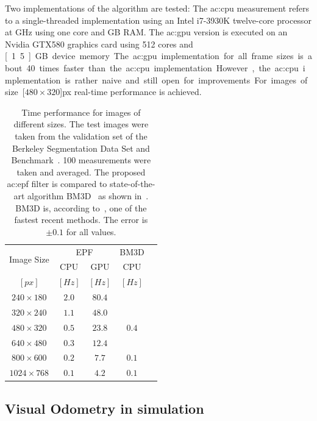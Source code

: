 Two implementations of the algorithm are tested: The \gls{ac:cpu} measurement refers to a single-threaded implementation using an Intel i7-3930K twelve-core processor at \unit[3,2]{GHz} using one core and \unit[16]{GB} RAM. 
The \gls{ac:gpu} version is executed on an Nvi\-dia GTX580 graphics card using 512 cores and \unit[1.5]{GB} device memory. 
The \gls{ac:gpu} implementation for all frame sizes is about 40 times faster than the \gls{ac:cpu} implementation. 
However, the \gls{ac:cpu} implementation is rather naive and still open for improvements. 
For images of size \unit[$480 \times 320$]{px} real-time performance is achieved.

\begin{table}[]
  \centering
  \begin{tabular}{ccc|cc}
    \toprule
    \multirow{2}{*}{Image Size}   & \multicolumn{2}{c}{EPF}   & BM3D\\
                                  & CPU  & GPU                & CPU\\
    $\unit{[px]}$    & $\unit{[Hz]}$    & $\unit{[Hz]}$    & $\unit{[Hz]}$\\
    \midrule
    $240 \times 180$  & $2.0$  & $80.4$  &\\
    $320 \times 240$  & $1.1$  & $48.0$  &\\
    $480 \times 320$  & $0.5$  & $23.8$  & $0.4$\\
    $640 \times 480$  & $0.3$  & $12.4$  &\\
    $800 \times 600$  & $0.2$  &  $7.7$  & $0.1$\\
    $1024 \times 768$ & $0.1$  &  $4.2$  & $0.1$\\
    \bottomrule
  \end{tabular}
  \caption{Time performance for images of different sizes. The test images were taken from the validation set of the Berkeley Segmentation Data Set and Benchmark~\cite{arbelaez2011contour}. 100 measurements were taken and averaged. The proposed \gls{ac:epf} filter is compared to state-of-the-art algorithm BM3D~\cite{dabov2007image} as shown in~\cite{shao2014heuristic}. BM3D is, according to~\cite{shao2014heuristic}, one of the fastest recent methods. The error is $\pm 0.1$ for all values.}
  \label{tab:sensor_experiments_resfps}
\end{table}





\subsection{Visual Odometry in simulation}
\label{ssec:perception_results_visualodometryinsimulation}

